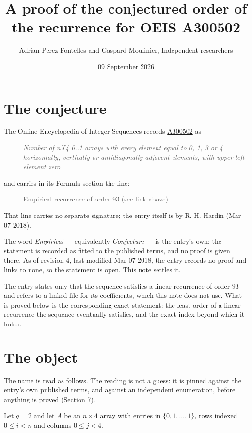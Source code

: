 \documentclass[11pt]{article}
\title{A proof of the conjectured order of the recurrence for OEIS A300502}
\author{Adrian Perez Fontelles and Gaspard Moulinier, Independent researchers}
\date{09 September 2026}
\theoremstyle{definition}
\begin{document}
\maketitle
\section{The conjecture}

The Online Encyclopedia of Integer Sequences records \href{https://oeis.org/A300502}{A300502} as

\begin{quote}\itshape Number of nX4 0..1 arrays with every element equal to 0, 1, 3 or 4 horizontally, vertically or antidiagonally adjacent elements, with upper left element zero\end{quote}

and carries in its Formula section the line:

\begin{quote}\ttfamily Empirical recurrence of order 93 (see link above)\end{quote}

That line carries no separate signature; the entry itself is by R. H. Hardin (Mar 07 2018).

The word {\itshape Empirical} --- equivalently {\itshape Conjecture} --- is the entry's own: the statement is recorded as fitted to the published terms, and no proof is given there. As of revision 4, last modified Mar 07 2018, the entry records no proof and links to none, so the statement is open. This note settles it.

The entry states only that the sequence satisfies a linear recurrence of order $93$ and refers to a linked file for its coefficients, which this note does not use. What is proved below is the corresponding exact statement: the least order of a linear recurrence the sequence eventually satisfies, and the exact index beyond which it holds.

\section{The object}

The name is read as follows. The reading is not a guess: it is pinned against the entry's own published terms, and against an independent enumeration, before anything is proved (Section 7).

Let $q = 2$ and let $A$ be an $n \times 4$ array with entries in $\{0,1,\dots,1\}$, rows indexed $0 \le i < n$ and columns $0 \le j < 4$.
\end{document}
